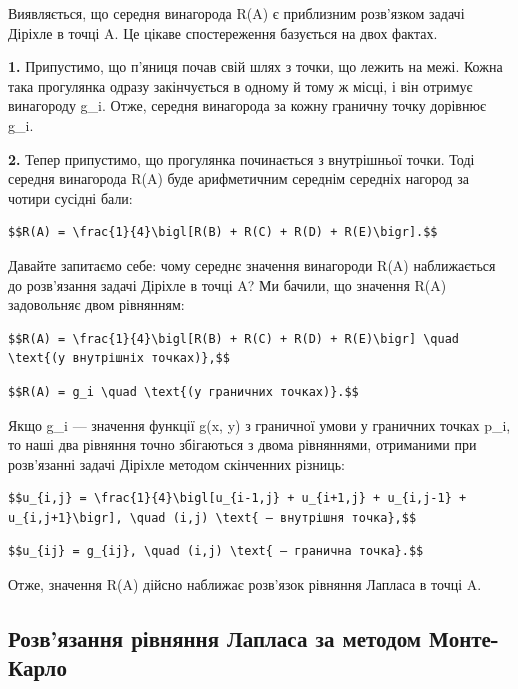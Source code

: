 \documentclass[
  ukrainian,
]{article}
\begin{document}
Виявляється, що середня винагорода R(A) є приблизним розв'язком задачі
Діріхле в точці A. Це цікаве спостереження базується на двох фактах.

\textbf{1.} Припустимо, що п'яниця почав свій шлях з точки, що лежить на
межі. Кожна така прогулянка одразу закінчується в одному й тому ж місці,
і він отримує винагороду g\_i. Отже, середня винагорода за кожну
граничну точку дорівнює g\_i.

\textbf{2.} Тепер припустимо, що прогулянка починається з внутрішньої
точки. Тоді середня винагорода R(A) буде арифметичним середнім середніх
нагород за чотири сусідні бали:

\begin{verbatim}
$$R(A) = \frac{1}{4}\bigl[R(B) + R(C) + R(D) + R(E)\bigr].$$
\end{verbatim}

Давайте запитаємо себе: чому середнє значення винагороди R(A)
наближається до розв'язання задачі Діріхле в точці A? Ми бачили, що
значення R(A) задовольняє двом рівнянням:

\begin{verbatim}
$$R(A) = \frac{1}{4}\bigl[R(B) + R(C) + R(D) + R(E)\bigr] \quad \text{(у внутрішніх точках)},$$
\end{verbatim}

\begin{verbatim}
$$R(A) = g_i \quad \text{(у граничних точках)}.$$
\end{verbatim}

Якщо g\_i --- значення функції g(x, y) з граничної умови у граничних
точках p\_i, то наші два рівняння точно збігаються з двома рівняннями,
отриманими при розв'язанні задачі Діріхле методом скінченних різниць:

\begin{verbatim}
$$u_{i,j} = \frac{1}{4}\bigl[u_{i-1,j} + u_{i+1,j} + u_{i,j-1} + u_{i,j+1}\bigr], \quad (i,j) \text{ — внутрішня точка},$$
\end{verbatim}

\begin{verbatim}
$$u_{ij} = g_{ij}, \quad (i,j) \text{ — гранична точка}.$$
\end{verbatim}

Отже, значення R(A) дійсно наближає розв'язок рівняння Лапласа в точці
A.

\subsection{Розв'язання рівняння Лапласа за методом
Монте-Карло}\label{ux440ux43eux437ux432ux44fux437ux430ux43dux43dux44f-ux440ux456ux432ux43dux44fux43dux43dux44f-ux43bux430ux43fux43bux430ux441ux430-ux437ux430-ux43cux435ux442ux43eux434ux43eux43c-ux43cux43eux43dux442ux435-ux43aux430ux440ux43bux43e}
\end{document}
